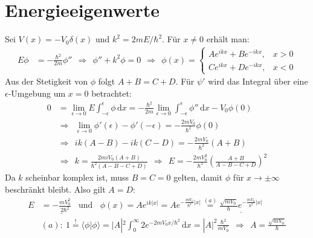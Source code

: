 \documentclass[a4paper,12pt]{article}
\newcommand{\brak}{}
\newcommand{\intx}{}
\newcommand{\kla}{}
\begin{document}
\section{Energieeigenwerte}
Sei $V(x)=-V_0\delta(x)$ und $k^2=2mE/\hbar^2$. Für $x\neq 0$ erhält man:
\begin{align*}
E\phi &=-\frac{\hbar^2}{2m}\phi''\ \ \Rightarrow\ \ \phi''+k^2\phi=0\ \ \Rightarrow\ \ \phi(x)=\left\{\begin{matrix}
Ae^{ikx}+Be^{-ikx}, & x>0 \\
Ce^{ikx}+De^{-ikx}, & x<0
\end{matrix}\right.
\end{align*}
Aus der Stetigkeit von $\phi$ folgt $A+B=C+D$. Für $\psi'$ wird das Integral über eine $\epsilon$-Umgebung um $x=0$ betrachtet:
\begin{align*}
0&=\lim_{\epsilon\rightarrow 0} E\int_{-\epsilon}^\epsilon \phi\,\mathrm{d}x=-\frac{\hbar^2}{2m}\lim_{\epsilon\rightarrow 0}\int_{-\epsilon}^\epsilon \phi''\,\mathrm{d}x-V_0\phi(0)\\
&\Rightarrow\ \ \lim_{\epsilon\rightarrow 0}\phi'(\epsilon)-\phi'(-\epsilon)=-\frac{2mV_0}{\hbar^2}\phi(0)\\
&\Rightarrow\ \ ik(A-B)-ik(C-D)=-\frac{2mV_0}{\hbar^2}(A+B)\\
&\Rightarrow\ \ k=\frac{2miV_0(A+B)}{\hbar^2(A-B-C+D)}\ \ \Rightarrow\ \ E=-\frac{2mV_0^2}{\hbar^2}\kla\left( {\frac{A+B}{A-B-C+D}} \right) ^2
\end{align*}
Da $k$ scheinbar komplex ist, muss $B=C=0$ gelten, damit $\phi$ für $x\rightarrow \pm\infty$ beschränkt bleibt. Also gilt $A=D$:
\begin{align*}
E&=\underline{-\frac{mV_0^2}{2\hbar^2}}\ \ \ \ \mathrm{und}\ \ \ \ \phi(x)=Ae^{ik|x|}=Ae^{-\frac{mV_0}{\hbar^2}|x|}\overset{(a)}{=}\underline{\frac{\sqrt{mV_0}}{\hbar}e^{-\frac{mV_0}{\hbar^2}|x|}}\\
&(a):\ 1\overset{!}{=}\brak\langle {\phi}| {\phi}\rangle =|A|^2\intx\int_{0}^{\infty}2e^{-2mV_0x/\hbar^2}\,\mathrm{d}x =|A|^2\frac{\hbar^2}{mV_0}\ \ \Rightarrow\ \ A=\frac{\sqrt{mV_0}}{\hbar}
\end{align*}
\end{document}
